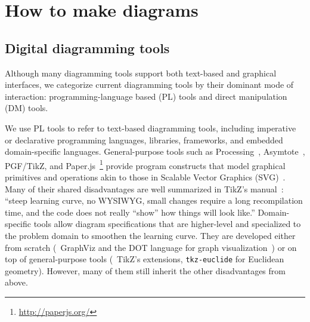 \section{How to make diagrams}


\subsection{Digital diagramming tools}
\label{sec:related-systems}

Although many diagramming tools support both text-based and graphical interfaces, we categorize current diagramming tools by their dominant mode of interaction: programming-language based (PL) tools and direct manipulation (DM) tools. 

We use PL tools to refer to text-based diagramming tools, including imperative or declarative programming languages, libraries, frameworks, and embedded domain-specific languages. General-purpose tools such as Processing~\cite{Reas:2006:PPM}, Asymtote~\cite{Bowman:2008:AVG}, PGF/TikZ, and Paper.js~\footnote{\url{http://paperjs.org/}} provide program constructs that model graphical primitives and operations akin to those in Scalable Vector Graphics (SVG)~\cite{SVGStandard}. Many of their shared disadvantages are well summarized in TikZ's manual~\cite{TikZ-Manual}: ``steep learning curve, no WYSIWYG, small changes require a long recompilation time, and the code does not really ``show'' how things will look like.'' Domain-specific tools allow diagram specifications that are higher-level and specialized to the problem domain to smoothen the learning curve. They are developed either from scratch (\eg~GraphViz and the DOT language for graph visualization~\cite{Graphviz}) or on top of general-purpose tools (\eg~TikZ's extensions, \texttt{tkz-euclide} for Euclidean geometry). However, many of them still inherit the other disadvantages from above. 

